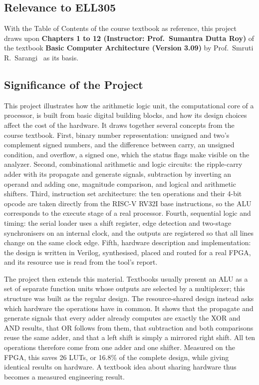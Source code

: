\documentclass[12pt,a4paper,twoside]{article}
\begin{document}
\subsection{Relevance to ELL305}
\label{sec:relevance}

With the Table of Contents of the course textbook as reference, this project draws
upon \textbf{Chapters 1 to 12 (Instructor: Prof.\ Sumantra Dutta Roy)} of the
textbook \textbf{Basic Computer Architecture (Version 3.09)} by
Prof.\ Smruti R.\ Sarangi~\cite{sarangi} as its basis.

\subsection{Significance of the Project}
\label{sec:significance}

This project illustrates how the arithmetic logic unit, the computational core of a
processor, is built from basic digital building blocks, and how its design choices
affect the cost of the hardware. It draws together several concepts from the course
textbook. First, binary number representation: unsigned and two's complement
signed numbers, and the difference between carry, an unsigned condition, and
overflow, a signed one, which the status flags make visible on the
analyzer. Second, combinational arithmetic and logic circuits: the ripple-carry
adder with its propagate and generate signals, subtraction by inverting an operand
and adding one, magnitude comparison, and logical and arithmetic shifters. Third,
instruction set architecture: the ten
operations and their 4-bit opcode are taken directly from the RISC-V RV32I base
instructions, so the ALU corresponds to the execute stage of a real processor.
Fourth, sequential logic and timing: the serial loader uses a shift register, edge
detection and two-stage synchronisers on an internal clock, and the outputs are
registered so that all lines change on the same clock edge. Fifth, hardware
description and implementation: the design is written in Verilog,
synthesised, placed and routed for a real FPGA, and its resource use is read from
the tool's report.

The project then extends this material. Textbooks usually present an ALU as a set
of separate function units whose outputs are selected by a multiplexer; this
structure was built as the regular design. The resource-shared design instead asks
which hardware the operations have in common. It shows that the propagate and
generate signals that every adder already computes are exactly the XOR and AND
results, that OR follows from them, that subtraction and both comparisons reuse
the same adder, and that a left shift is simply a mirrored right shift. All ten
operations therefore come from one adder and one shifter. Measured on the FPGA,
this saves 26 LUTs, or 16.8\% of the complete design, while giving identical
results on hardware. A textbook idea about sharing hardware thus becomes a
measured engineering result.
\end{document}
